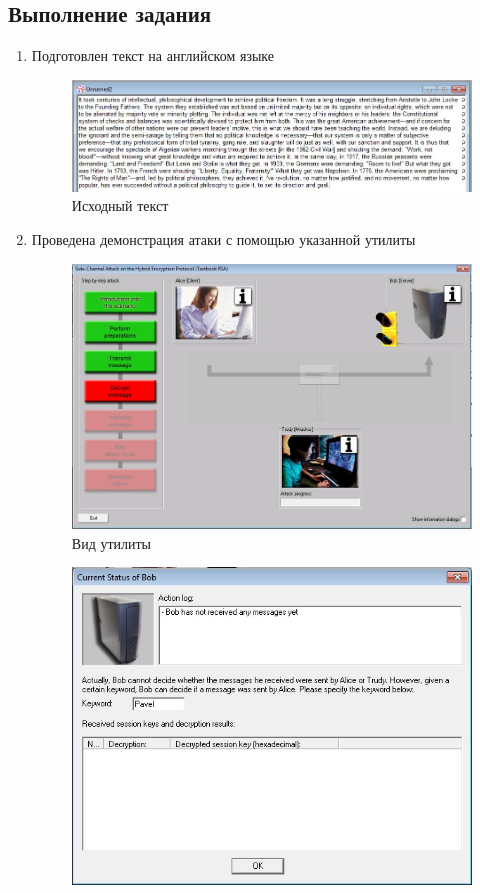 \documentclass[a4paper, 14pt]{extarticle}
\begin{document}
\subsection{Выполнение задания}
\begin{enumerate}
    \item Подготовлен текст на английском языке
    \begin{figure}[h]
        \centering
        \includegraphics[width=\textwidth]{img/S007.jpg}
        \caption{Исходный текст}%
        \label{img:e:1}
    \end{figure}
    \FloatBarrier{}
    \item Проведена демонстрация атаки с помощью указанной утилиты
    \begin{figure}[h]
        \centering
        \includegraphics[width=\textwidth]{img/S010.jpg}
        \caption{Вид утилиты}%
        \label{img:e:4}
    \end{figure}
    \begin{figure}[h]
        \centering
        \includegraphics[width=\textwidth]{img/S008.jpg}

\end{figure}
\end{enumerate}
\end{document}
